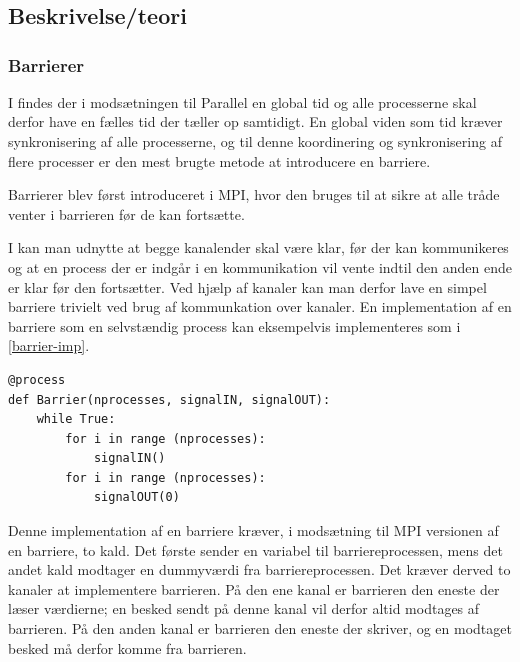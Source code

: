 \chapter{\des}
  \section{Beskrivelse/teori}\label{sec:des-theory}
   
\subsection{Barrierer}\label{barrier}
I \des findes der i modsætningen til Parallel \des {} en global 
tid og alle processerne skal derfor have en fælles tid der tæller op samtidigt.  
En global viden som tid kræver synkronisering af alle processerne, 
og til denne koordinering og synkronisering af flere processer er den mest 
brugte metode at introducere en barriere.

Barrierer blev først introduceret i MPI, hvor den bruges til at 
sikre at alle tråde venter i barrieren før de kan fortsætte. 

I \pycsp kan man udnytte at begge kanalender skal være klar, før der kan 
kommunikeres og at en process der er indgår i en kommunikation vil vente indtil 
den anden ende er klar før den fortsætter. Ved hjælp af kanaler kan man derfor 
lave en simpel barriere trivielt ved brug af kommunkation over kanaler. En 
implementation af en barriere som en selvstændig process kan eksempelvis 
implementeres som i \cref{barrier-imp}.

\begin{lstlisting}[float, label=barrier-imp,caption=En barriere i \pycsp]
@process
def Barrier(nprocesses, signalIN, signalOUT):
	while True:
		for i in range (nprocesses):
			signalIN()
		for i in range (nprocesses):
			signalOUT(0)
\end{lstlisting}

Denne implementation af en barriere kræver, i modsætning til MPI versionen af 
en barriere, to kald. Det første sender en variabel til barriereprocessen, mens 
det andet kald modtager en dummyværdi fra barriereprocessen. Det kræver derved 
to kanaler at implementere barrieren. På den ene kanal er barrieren den eneste 
der læser værdierne; en besked sendt på denne kanal vil derfor altid modtages 
af barrieren. På den anden kanal er barrieren den eneste der skriver, og en 
modtaget besked må derfor komme fra barrieren.

